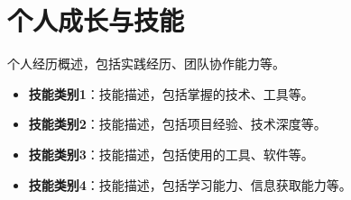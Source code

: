 \documentclass[11pt]{article}
\newlength{\iconwidth}
\begin{document}
    \begin{minipage}[t]{\textwidth}
    \section[个人成长]{\makebox[\iconwidth][c]{\color{primary_color}{\faBookOpen}}\quad 个人成长与技能}

    个人经历概述，包括实践经历、团队协作能力等。
    \begin{itemize}
        \item \textbf{技能类别1}：技能描述，包括掌握的技术、工具等。
        \item \textbf{技能类别2}：技能描述，包括项目经验、技术深度等。
        \item \textbf{技能类别3}：技能描述，包括使用的工具、软件等。
        \item \textbf{技能类别4}：技能描述，包括学习能力、信息获取能力等。
    \end{itemize}
    
    \end{minipage}
\end{document}
